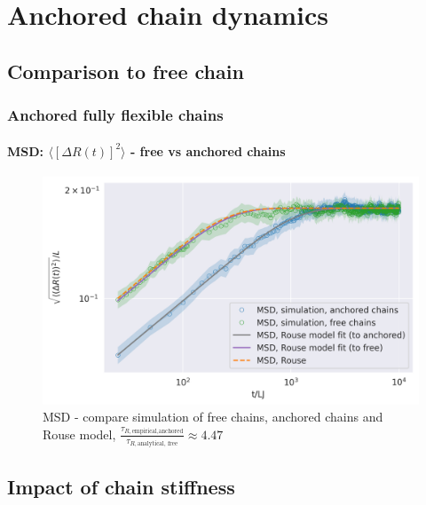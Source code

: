 \documentclass[handout]{beamer}
\newcommand{\mean}[1]{\langle #1 \rangle}
\begin{document}
\section{Anchored chain dynamics}

\subsection{Comparison to free chain}

\begin{frame}
    \frametitle{Anchored fully flexible chains}
    \framesubtitle{MSD: $\mean{[\Delta R(t)]^2}$ - free vs anchored chains}

    \begin{figure}[h]
        \includegraphics[trim={0.1cm 0.1cm 0.1cm 1cm},clip,width=\textwidth]{./3-exp-free-param-log.png}
        \caption{
            MSD - compare simulation of free chains, anchored chains and Rouse model,
            $\frac{\tau_{R, \textrm{empirical,anchored}}}{\tau_{R, \textrm{analytical, free}}} \approx 4.47$
        }
        \label{fig:full-flex-chain-free-log}
    \end{figure}
\end{frame}

\subsection{Impact of chain stiffness}

\end{document}
